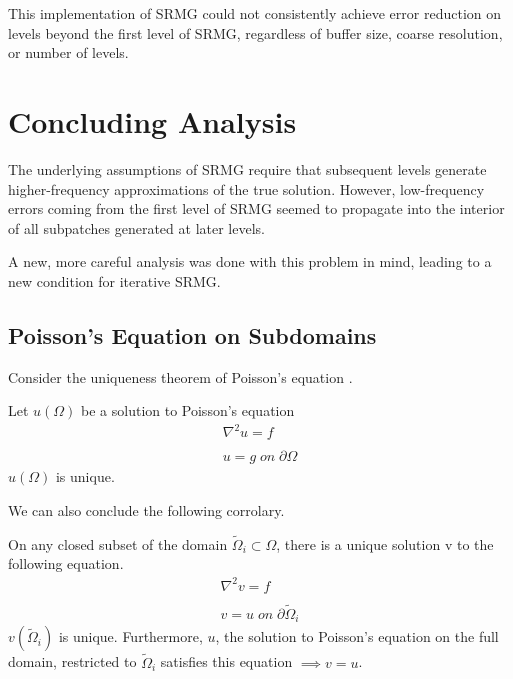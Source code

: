\documentclass[final]{siamart1116}
\numberwithin{theorem}{section}
\begin{document}
This implementation of SRMG could not consistently achieve error reduction on levels beyond the first level of SRMG, regardless of buffer size, coarse resolution, or number of levels. 

\section{Concluding Analysis}
The underlying assumptions of SRMG require that subsequent levels generate higher-frequency approximations of the true solution. However, low-frequency errors coming from the first level of SRMG seemed to propagate into the interior of all subpatches generated at later levels.  

A new, more careful analysis was done with this problem in mind, leading to a new condition for iterative SRMG.



\subsection{Poisson's Equation on Subdomains}

Consider the uniqueness theorem of Poisson's equation \cite{poissonunique}.

\begin{theorem}
Let $u(\Omega)$ be a solution to Poisson's equation
\begin{align*} 
\nabla^2 u = f\\
\\ u = g \; on \; \partial \Omega 
\end{align*}
$u(\Omega)$ is unique. 
\end{theorem}

 We can also conclude the following corrolary. 

\begin{corollary}
\label{corollaryunique}
On any closed subset of the domain $\tilde{\Omega}_i \subset \Omega$, there is a unique solution v to the following equation. 
\begin{align*} 
\nabla^2 v = f\\
\\ v = u \; on \; \partial \tilde{\Omega}_i 
\end{align*}
$v(\tilde{\Omega}_i)$ is unique. 
Furthermore, $u$, the solution to Poisson's equation on the full domain, restricted to $\tilde{\Omega}_i$ satisfies this equation $\implies v = u$. 
\end{corollary}
\end{document}
